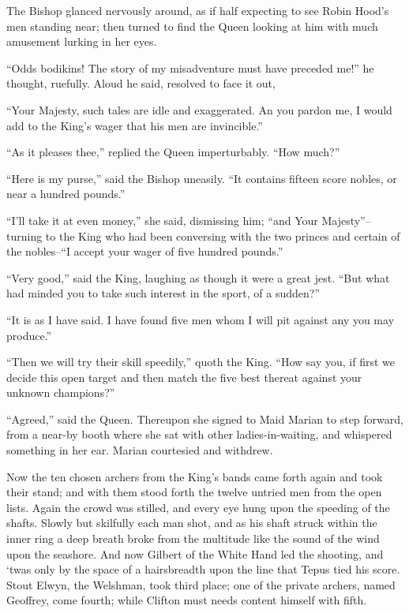 The Bishop glanced nervously around, as if half expecting to see Robin
Hood's men standing near; then turned to find the Queen looking at him
with much amusement lurking in her eyes.

``Odds bodikins! The story of my misadventure must have preceded me!''
he thought, ruefully. Aloud he said, resolved to face it out,

``Your Majesty, such tales are idle and exaggerated. An you pardon me, I
would add to the King's wager that his men are invincible.''

``As it pleases thee,'' replied the Queen imperturbably. ``How much?''

``Here is my purse,'' said the Bishop uneasily. ``It contains fifteen
score nobles, or near a hundred pounds.''

``I'll take it at even money,'' she said, dismissing him; ``and Your
Majesty''--turning to the King who had been conversing with the two
princes and certain of the nobles--``I accept your wager of five hundred
pounds.''

``Very good,'' said the King, laughing as though it were a great jest.
``But what had minded you to take such interest in the sport, of a
sudden?''

``It is as I have said. I have found five men whom I will pit against
any you may produce.''

``Then we will try their skill speedily,'' quoth the King. ``How say
you, if first we decide this open target and then match the five best
thereat against your unknown champions?''

``Agreed,'' said the Queen. Thereupon she signed to Maid Marian to step
forward, from a near-by booth where she sat with other
ladies-in-waiting, and whispered something in her ear. Marian courtesied
and withdrew.

Now the ten chosen archers from the King's bands came forth again and
took their stand; and with them stood forth the twelve untried men from
the open lists. Again the crowd was stilled, and every eye hung upon the
speeding of the shafts. Slowly but skilfully each man shot, and as his
shaft struck within the inner ring a deep breath broke from the
multitude like the sound of the wind upon the seashore. And now Gilbert
of the White Hand led the shooting, and `twas only by the space of a
hairsbreadth upon the line that Tepus tied his score. Stout Elwyn, the
Welshman, took third place; one of the private archers, named Geoffrey,
come fourth; while Clifton must needs content himself with fifth.


